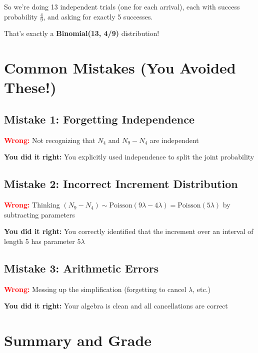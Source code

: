 \documentclass[11pt]{article}
\begin{document}
So we're doing 13 independent trials (one for each arrival), each with success probability $\frac{4}{9}$, and asking for exactly 5 successes.

That's exactly a \textbf{Binomial(13, 4/9)} distribution!

\section{Common Mistakes (You Avoided These!)}

\subsection{Mistake 1: Forgetting Independence}

\textcolor{red}{\textbf{Wrong:}} Not recognizing that $N_4$ and $N_9 - N_4$ are independent

\textcolor{green!60!black}{\textbf{You did it right:}} You explicitly used independence to split the joint probability

\subsection{Mistake 2: Incorrect Increment Distribution}

\textcolor{red}{\textbf{Wrong:}} Thinking $(N_9 - N_4) \sim \text{Poisson}(9\lambda - 4\lambda) = \text{Poisson}(5\lambda)$ by subtracting parameters

\textcolor{green!60!black}{\textbf{You did it right:}} You correctly identified that the increment over an interval of length 5 has parameter $5\lambda$

\subsection{Mistake 3: Arithmetic Errors}

\textcolor{red}{\textbf{Wrong:}} Messing up the simplification (forgetting to cancel $\lambda$, etc.)

\textcolor{green!60!black}{\textbf{You did it right:}} Your algebra is clean and all cancellations are correct

\section{Summary and Grade}
\end{document}
